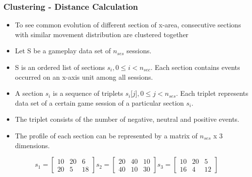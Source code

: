 \documentclass{beamer}
\begin{document}
\begin{frame}
\frametitle{Clustering - Distance Calculation}
\begin{itemize}
\item To see common evolution of different section of x-area, consecutive sections with similar movement distribution are clustered together
\item Let S be a gameplay data set of $n_{ses}$ sessions. 
\item S is an ordered list of sections $s_i, 0 \le i < n_{sec}$. Each section contains events occurred on an x-axis unit among all sessions. 
\item A section $s_i$ is a sequence of triplets $s_i\lbrack j \rbrack, 0 \le j < n_{ses}$. Each triplet represents data set of a certain game session of a particular section $s_i$. 
\item The triplet consists of the number of negative, neutral and positive events. 
\item The profile of each section can be represented by a matrix of $n_{ses}$ x 3 dimensions.
\end{itemize}
\[
\textit{s}_1 = \begin{bmatrix}
  10 & 20 & 6\\
  20 & 5 & 18
\end{bmatrix}
\textit{s}_2 = \begin{bmatrix}
  20 & 40 & 10\\ 
  40 & 10 & 30
\end{bmatrix}
\textit{s}_3 = \begin{bmatrix}
  10 & 20 & 5\\
  16 & 4 & 12 
\end{bmatrix}
\]
\end{frame}
\end{document}
